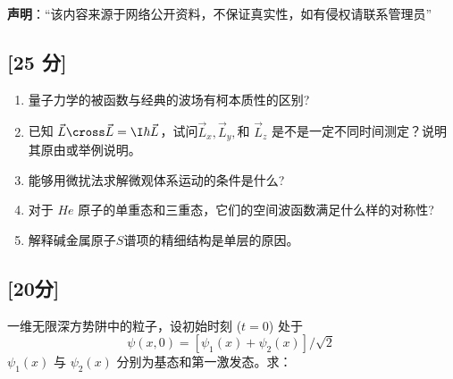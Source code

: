 
\textbf{声明}：“该内容来源于网络公开资料，不保证真实性，如有侵权请联系管理员”

\subsection{[25 分]}
\begin{enumerate}
\item 量子力学的被函数与经典的波场有柯本质性的区别?
\item 已知 $\vec L \cross \vec L = \I \hbar \vec L$，试问$\vec L_x, \vec L_y,$和 $\vec L_z$ 是不是一定不同时间测定？说明其原由或举例说明。
\item 能够用微扰法求解微观体系运动的条件是什么?
\item 对于 $He$ 原子的单重态和三重态，它们的空间波函数满足什么样的对称性?
\item 解释碱金属原子$S$谱项的精细结构是单层的原因。
\end{enumerate}
\subsection{[20分]}
一维无限深方势阱中的粒子，设初始时刻 ($t = 0$) 处于
\[
\psi(x, 0) = [\psi_1(x) + \psi_2(x)]/\sqrt{2}~
\]
$\psi_1(x)$ 与 $\psi_2(x)$ 分别为基态和第一激发态。求：
